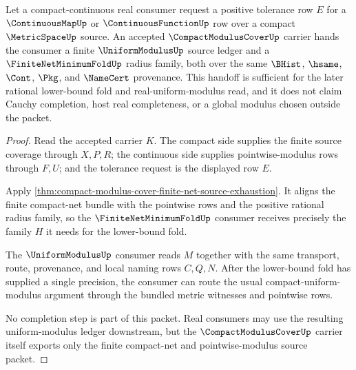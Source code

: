 \begin{theorem}
\label{thm:compact-modulus-cover-real-completion-handoff}
Let a compact-continuous real consumer request a positive tolerance row $E$ for a $\ContinuousMapUp$ or $\ContinuousFunctionUp$ row over a compact $\MetricSpaceUp$ source. An accepted $\CompactModulusCoverUp$ carrier hands the consumer a finite $\UniformModulusUp$ source ledger and a $\FiniteNetMinimumFoldUp$ radius family, both over the same $\BHist$, $\hsame$, $\Cont$, $\Pkg$, and $\NameCert$ provenance. This handoff is sufficient for the later rational lower-bound fold and real-uniform-modulus read, and it does not claim Cauchy completion, host real completeness, or a global modulus chosen outside the packet.
\end{theorem}
\begin{proof}
Read the accepted carrier $K$. The compact side supplies the finite source coverage through $X,P,R$; the continuous side supplies pointwise-modulus rows through $F,U$; and the tolerance request is the displayed row $E$.

Apply \autoref{thm:compact-modulus-cover-finite-net-source-exhaustion}. It aligns the finite compact-net bundle with the pointwise rows and the positive rational radius family, so the $\FiniteNetMinimumFoldUp$ consumer receives precisely the family $H$ it needs for the lower-bound fold.

The $\UniformModulusUp$ consumer reads $M$ together with the same transport, route, provenance, and local naming rows $C,Q,N$. After the lower-bound fold has supplied a single precision, the consumer can route the usual compact-uniform-modulus argument through the bundled metric witnesses and pointwise rows.

No completion step is part of this packet. Real consumers may use the resulting uniform-modulus ledger downstream, but the $\CompactModulusCoverUp$ carrier itself exports only the finite compact-net and pointwise-modulus source packet.
\end{proof}

